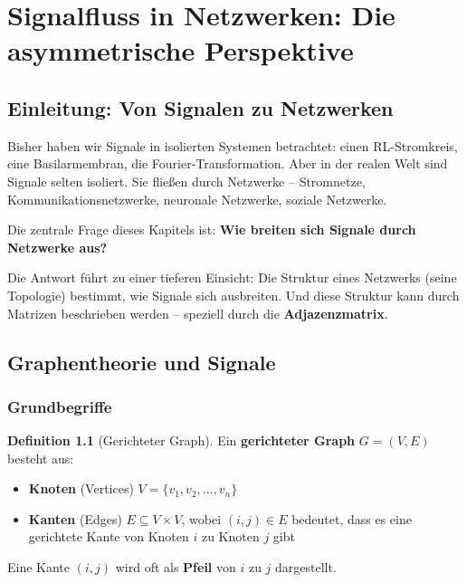 ﻿\documentclass[a4paper,12pt]{report}
\theoremstyle{definition}
\newtheorem{definition}{Definition}
\begin{document}
	\chapter{Signalfluss in Netzwerken: Die asymmetrische Perspektive}
	
	\section{Einleitung: Von Signalen zu Netzwerken}
	
	Bisher haben wir Signale in isolierten Systemen betrachtet: einen RL-Stromkreis, eine Basilarmembran, die Fourier-Transformation. Aber in der realen Welt sind Signale selten isoliert. Sie fließen durch Netzwerke -- Stromnetze, Kommunikationsnetzwerke, neuronale Netzwerke, soziale Netzwerke.
	
	Die zentrale Frage dieses Kapitels ist: \textbf{Wie breiten sich Signale durch Netzwerke aus?}
	
	Die Antwort führt zu einer tieferen Einsicht: Die Struktur eines Netzwerks (seine Topologie) bestimmt, wie Signale sich ausbreiten. Und diese Struktur kann durch Matrizen beschrieben werden -- speziell durch die \textbf{Adjazenzmatrix}.
	
	\section{Graphentheorie und Signale}
	
	\subsection{Grundbegriffe}
	
	\begin{definition}[Gerichteter Graph]
		Ein \textbf{gerichteter Graph} $G = (V, E)$ besteht aus:
		\begin{itemize}
			\item[-] \textbf{Knoten} (Vertices) $V = \{v_1, v_2, \ldots, v_n\}$
			\item[-] \textbf{Kanten} (Edges) $E \subseteq V \times V$, wobei $(i,j) \in E$ bedeutet, dass es eine gerichtete Kante von Knoten $i$ zu Knoten $j$ gibt
		\end{itemize}
		
		Eine Kante $(i,j)$ wird oft als \textbf{Pfeil} von $i$ zu $j$ dargestellt.
	\end{definition}
	
\end{document}
